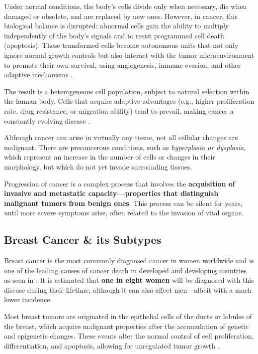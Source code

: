 Under normal conditions, the body's cells divide only when necessary, die when
damaged or obsolete, and are replaced by new ones. However, in cancer, this
biological balance is disrupted: abnormal cells gain the ability to multiply
independently of the body's signals and to resist programmed cell death
(apoptosis). These transformed cells become autonomous units that not only
ignore normal growth controls but also interact with the tumor microenvironment
to promote their own survival, using angiogenesis, immune evasion, and other
adaptive mechanisms \cite{def_of_cancer_Brown2023,NCI2021}.

The result is a heterogeneous cell population, subject to natural selection
within the human body. Cells that acquire adaptive advantages (e.g., higher
proliferation rate, drug resistance, or migration ability) tend to prevail,
making cancer a constantly evolving disease \cite{def_of_cancer_Brown2023}.

Although cancer can arise in virtually any tissue, not all cellular changes are
malignant. There are precancerous conditions, such as \textit{hyperplasia or
  dysplasia}, which represent an increase in the number of cells or changes in
their morphology, but which do not yet invade surrounding tissues.

Progression of cancer is a complex process that involves the
\textbf{acquisition of invasive and metastatic capacity—properties that
  distinguish malignant tumors from benign ones}. This process can be silent for
years, until more severe symptoms arise, often related to the invasion of vital
organs.

\subsection{Breast Cancer \& its Subtypes}

Breast cancer is the most commonly diagnosed cancer in women worldwide and is
one of the leading causes of cancer death in developed and developing countries
as seen in \textcite{BreastEpidemiology_Romanowicz2022,
  updatedbca_Hong2022Breast}. It is estimated that \textbf{one in eight women}
will be diagnosed with this disease during their lifetime, although it can also
affect men—albeit with a much lower incidence.

Most breast tumors are originated in the epithelial cells of the ducts or
lobules of the breast, which acquire malignant properties after the
accumulation of genetic and epigenetic changes. These events alter the normal
control of cell proliferation, differentiation, and apoptosis, allowing for
unregulated tumor growth \cite{origins_and_evolution_bca_Polyak2007}.


